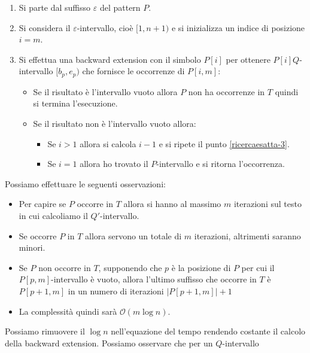 \begin{enumerate}
    \item Si parte dal suffisso $\varepsilon$ del pattern $P$.
    \item Si considera il $\varepsilon$-intervallo, cioè $[1, n + 1)$ e si
          inizializza un indice di posizione $i = m$.
    \item \label{ricercaesatta-3} Si effettua una backward extension con il
          simbolo $P[i]$ per ottenere $P[i]Q$-intervallo $[b_p, e_p)$ che
          fornisce le occorrenze di $P[i,m]$:
          \begin{itemize}
              \item Se il risultato è l'intervallo vuoto allora $P$ non ha
                    occorrenze in $T$ quindi si termina l'esecuzione.
              \item Se il risultato non è l'intervallo vuoto allora:
                    \begin{itemize}
                        \item Se $i > 1$ allora si calcola $i - 1$ e si ripete
                              il punto \ref{ricercaesatta-3}.
                        \item Se $i = 1$ allora ho trovato il $P$-intervallo e
                              si ritorna l'occorrenza.
                    \end{itemize}
          \end{itemize}
\end{enumerate}
Possiamo effettuare le seguenti osservazioni:
\begin{itemize}
    \item Per capire se $P$ occorre in $T$ allora si hanno al massimo $m$
          iterazioni sul testo in cui calcoliamo il $Q'$-intervallo.
    \item Se occorre $P$ in $T$ allora servono un totale di $m$ iterazioni,
          altrimenti saranno minori.
    \item Se $P$ non occorre in $T$, supponendo che $p$ è la posizione di $P$
          per cui il $P[p, m]$-intervallo è vuoto, allora l'ultimo suffisso che
          occorre in $T$ è $P[p + 1, m]$ in un numero di iterazioni $|P[p + 1,
              m]| + 1$
    \item La complessità quindi sarà $\mathcal{O}(m \log n)$.
\end{itemize}
Possiamo rimuovere il $\log n$ nell'equazione del tempo rendendo costante
il calcolo della backward extension. Possiamo osservare che per un $Q$-intervallo
